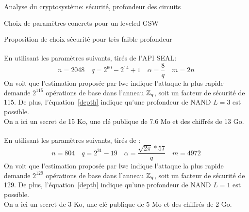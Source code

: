\begin{section}{Analyse du cryptosystème: sécurité, profondeur des circuits}
\begin{subsection}{Choix de paramètres concrets pour un leveled GSW}
\begin{subsubsection}{Proposition de choix sécurité pour très faible profondeur}
	\paragraph{}
	En utilisant les paramètres suivants, tirés de l'API SEAL:
	\[n = 2048\quad q = 2^{60} - 2^{14} + 1 \quad \alpha = \frac{8}{q}\quad m = 2n \]
	On voit que l'estimation proposée par lwe indique  l'attaque la plus rapide demande $2^{115}$ opérations de base dans l'anneau $\mathbb{Z}_q$, soit un facteur de sécurité de 115. De plus, l'équation~\eqref{depth} indique qu'une profondeur de NAND $L=3$ est possible. \\
	On a ici un secret de 15 Ko, une clé publique de 7.6 Mo et des chiffrés de 13 Go.

	\paragraph{}
	En utilisant les paramètres suivants, tirés de \cite{cryptoeprint:2015:755}:
	\[n = 804\quad  q = 2^{31} - 19\quad \alpha = \frac{\sqrt{2\pi}*57}{q} \quad m = 4972\]
	On voit que l'estimation proposée par lwe indique  l'attaque la plus rapide demande $2^{129}$ opérations de base dans l'anneau $\mathbb{Z}_q$, soit un facteur de sécurité de 129. De plus, l'équation~\eqref{depth} indique qu'une profondeur de NAND $L=1$ est possible. \\
	On a ici un secret de 3 Ko, une clé publique de 5 Mo et des chiffrés de 2 Go.
	\end{subsubsection}

	\end{subsection}
\end{section}
